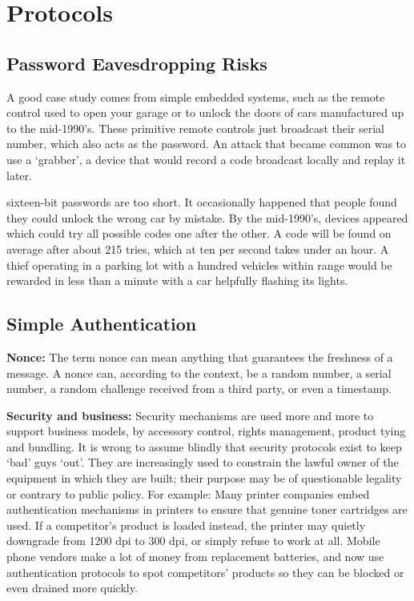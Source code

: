 \chapter{Protocols}

\clearpage
\section{Password Eavesdropping Risks}
A good case study comes from simple embedded systems, such as the remote control used to open
your garage or to unlock the doors of cars manufactured up to the mid-1990’s.
These primitive remote controls just broadcast their serial number, which also
acts as the password. An attack that became common was to use a ‘grabber’, a device 
that would record a code broadcast locally and replay it later. 

sixteen-bit passwords are too short. It occasionally happened that people found they could unlock 
the wrong car by mistake. By the mid-1990’s, devices appeared which could try all
possible codes one after the other. A code will be found on average after about
215 tries, which at ten per second takes under an hour. A thief operating in a
parking lot with a hundred vehicles within range would be rewarded in less
than a minute with a car helpfully flashing its lights.



\section{Simple Authentication}

	{\bf Nonce:} The term nonce can mean anything that guarantees the freshness of a
	message. A nonce can, according to the context, be a random number, a serial
	number, a random challenge received from a third party, or even a timestamp.

	{\bf Security and business: }
	Security mechanisms are used more and more to support business 
	models, by accessory control, rights management, product tying and bundling. It is
	wrong to assume blindly that security protocols exist to keep ‘bad’ guys ‘out’.
	They are increasingly used to constrain the lawful owner of the equipment in
	which they are built; their purpose may be of questionable legality or contrary
	to public policy. For example: Many printer companies embed authentication mechanisms 
	in printers to ensure that genuine toner cartridges are used. If a competitor’s 
	product is loaded instead, the printer may quietly downgrade from 1200 dpi to 300 dpi, 
	or simply refuse to work at all. Mobile phone vendors make a lot of money from 
	replacement batteries, and now use authentication protocols to spot competitors’ 
	products so they can be blocked or even drained more quickly. 

